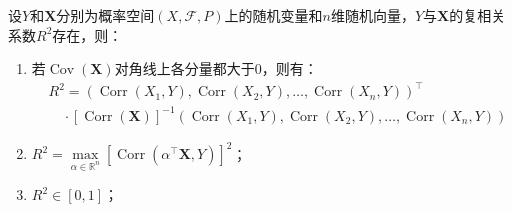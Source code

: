 \begin{property}\label{prop:MultipleCorrelationCoefficient}
	设$Y$和$\mathbf{X}$分别为概率空间$(X,\mathscr{F},P)$上的随机变量和$n$维随机向量，$Y$与$\mathbf{X}$的复相关系数$R^2$存在，则：
	\begin{enumerate}
		\item 若$\operatorname{Cov}(\mathbf{X})$对角线上各分量都大于$0$，则有：
		\begin{align*}
			&R^2=(\operatorname{Corr}(X_1,Y),\operatorname{Corr}(X_2,Y),\dots,\operatorname{Corr}(X_n,Y))^{\top} \\
			&\quad\cdot[\operatorname{Corr}(\mathbf{X})]^{-1}(\operatorname{Corr}(X_1,Y),\operatorname{Corr}(X_2,Y),\dots,\operatorname{Corr}(X_n,Y))
		\end{align*}
		\item $R^2=\max\limits_{\alpha\in\mathbb{R}^{n}}[\operatorname{Corr}(\alpha ^{\top}\mathbf{X},Y)]^2$；
		\item $R^2\in[0,1]$；
	\end{enumerate}
\end{property}
